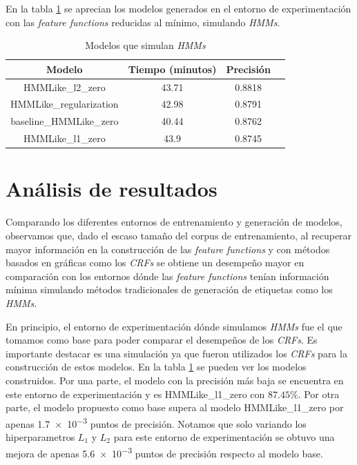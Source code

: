 \documentclass[letterpaper,12pt,oneside]{book}
\theoremstyle{definition}
\begin{document}
En la tabla \ref{tab:models-hmmlike} se aprecian los modelos generados en el entorno de experimentación con las \textit{feature functions} reducidas al mínimo, simulando \textit{HMMs}.

\begin{table}[ht]
    \centering
    \begin{tabular}{| c | c | c | c |}\hline
    \textbf{Modelo} & \textbf{Tiempo (minutos)} & \textbf{Precisión}\\\hline
    \textsf{HMMLike\_l2\_zero} & 43.71 & 0.8818\\
    \textsf{HMMLike\_regularization} & 42.98 & 0.8791\\\rowcolor{Yellow}
    \textsf{baseline\_HMMLike\_zero} & 40.44 & 0.8762\\
    \textsf{HMMLike\_l1\_zero} & 43.9 & 0.8745\\\hline
    \end{tabular}
    \caption{Modelos que simulan \textit{HMMs}}
    \label{tab:models-hmmlike}
\end{table}

\section{Análisis de resultados}

Comparando los diferentes entornos de entrenamiento y generación de modelos, observamos que, dado el escaso tamaño del corpus de entrenamiento, al recuperar mayor información en la construcción de las \textit{feature functions} y con métodos basados en gráficas como los \textit{CRFs} se obtiene un desempeño mayor en comparación con los entornos dónde las \textit{feature functions} tenían información mínima simulando métodos tradicionales de generación de etiquetas como los \textit{HMMs}.

En principio, el entorno de experimentación dónde simulamos \textit{HMMs} fue el que tomamos como base para poder comparar el desempeños de los \textit{CRFs}. Es importante destacar es una simulación ya que fueron utilizados los \textit{CRFs} para la construcción de estos modelos. En la tabla \ref{tab:models-hmmlike} se pueden ver los modelos construidos. Por una parte,  el modelo con la precisión más baja se encuentra en este entorno de experimentación y es \textsf{HMMLike\_l1\_zero} con $87.45\%$. Por otra parte, el modelo propuesto como base supera al modelo \textsf{HMMLike\_l1\_zero} por apenas \num{1.7e-3} puntos de precisión. Notamos que solo variando los hiperparametros $L_1$ y $L_2$ para este entorno de experimentación se obtuvo una mejora de apenas \num{5.6e-3} puntos de precisión respecto al modelo base.
\end{document}
